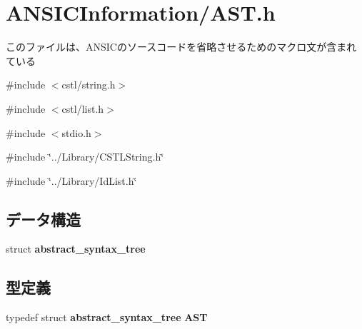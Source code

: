 \section{ANSICInformation/AST.h}
\label{_a_s_t_8h}


このファイルは、ANSICのソースコードを省略させるためのマクロ文が含まれている  


{\ttfamily \#include $<$cstl/string.h$>$}\par
{\ttfamily \#include $<$cstl/list.h$>$}\par
{\ttfamily \#include $<$stdio.h$>$}\par
{\ttfamily \#include \char`\"{}../Library/CSTLString.h\char`\"{}}\par
{\ttfamily \#include \char`\"{}../Library/IdList.h\char`\"{}}\par
\subsection*{データ構造}
\begin{DoxyCompactItemize}
\item 
struct {\bf abstract\_\-syntax\_\-tree}
\end{DoxyCompactItemize}
\subsection*{型定義}
\begin{DoxyCompactItemize}
\item 
typedef struct {\bf abstract\_\-syntax\_\-tree} {\bf AST}
\end{DoxyCompactItemize}
